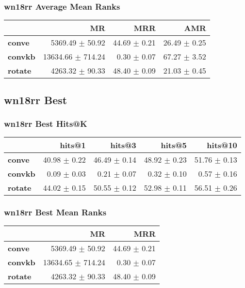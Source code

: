 \documentclass{article}
\begin{document}
\subsubsection{wn18rr Average Mean Ranks}
    \begin{center}
    \begin{tabular}{lrrr}
\toprule
{} &                 MR &           MRR &           AMR \\
\midrule
\textbf{conve } &    5369.49 $\pm$ 50.92 &  44.69 $\pm$ 0.21 &  26.49 $\pm$ 0.25 \\
\textbf{convkb} &  13634.66 $\pm$ 714.24 &   0.30 $\pm$ 0.07 &  67.27 $\pm$ 3.52 \\
\textbf{rotate} &    4263.32 $\pm$ 90.33 &  48.40 $\pm$ 0.09 &  21.03 $\pm$ 0.45 \\
\bottomrule
\end{tabular}

    \end{center}
\subsection{wn18rr Best}
\subsubsection{wn18rr Best Hits@K}
    \begin{center}
    \begin{tabular}{lrrrr}
\toprule
{} &        hits@1 &        hits@3 &        hits@5 &       hits@10 \\
\midrule
\textbf{conve } &  40.98 $\pm$ 0.22 &  46.49 $\pm$ 0.14 &  48.92 $\pm$ 0.23 &  51.76 $\pm$ 0.13 \\
\textbf{convkb} &   0.09 $\pm$ 0.03 &   0.21 $\pm$ 0.07 &   0.32 $\pm$ 0.10 &   0.57 $\pm$ 0.16 \\
\textbf{rotate} &  44.02 $\pm$ 0.15 &  50.55 $\pm$ 0.12 &  52.98 $\pm$ 0.11 &  56.51 $\pm$ 0.26 \\
\bottomrule
\end{tabular}

    \end{center}
\subsubsection{wn18rr Best Mean Ranks}
    \begin{center}
    \begin{tabular}{lrr}
\toprule
{} &                 MR &           MRR \\
\midrule
\textbf{conve } &    5369.49 $\pm$ 50.92 &  44.69 $\pm$ 0.21 \\
\textbf{convkb} &  13634.65 $\pm$ 714.24 &   0.30 $\pm$ 0.07 \\
\textbf{rotate} &    4263.32 $\pm$ 90.33 &  48.40 $\pm$ 0.09 \\
\bottomrule
\end{tabular}

    \end{center}
\end{document}
